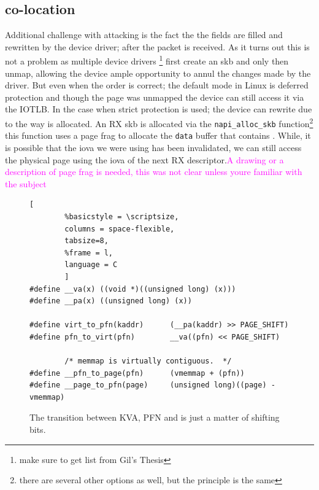 \subsection{\shinfo co-location}
Additional challenge with attacking \shinfo is the fact the the fields are filled and rewritten by the device driver; after the packet is received. As it turns out this is not a problem as multiple device drivers \footnote{make sure to get list from Gil's Thesis} first create an skb and only then unmap, allowing the device ample opportunity to annul the changes made by the driver. But even when the order is correct; the default mode in Linux is deferred protection and though the page was unmapped the device can still access it via the IOTLB. In the case when strict protection is used; the device can rewrite \shinfo due to the way \shinfo is allocated. An RX skb is allocated via the \texttt{napi\_alloc\_skb} function\footnote{there are several other options as well, but the principle is the same} this function uses a page frag to allocate the \texttt{data} buffer that contains \shinfo. While, it is possible that the iova we were using has been invalidated, we can still access the physical page using the iova of the next RX descriptor.\textcolor{magenta}{A drawing or a description of page frag is needed, this was not clear unless youre familiar with the subject}
\begin{figure}[t]
                \begin{lstlisting}[
        %basicstyle = \scriptsize,
        columns = space-flexible,
        tabsize=8,
        %frame = l,
        language = C
        ]
#define __va(x) ((void *)((unsigned long) (x)))
#define __pa(x) ((unsigned long) (x))

#define virt_to_pfn(kaddr)      (__pa(kaddr) >> PAGE_SHIFT)
#define pfn_to_virt(pfn)        __va((pfn) << PAGE_SHIFT)

        /* memmap is virtually contiguous.  */
#define __pfn_to_page(pfn)      (vmemmap + (pfn))  
#define __page_to_pfn(page)     (unsigned long)((page) - vmemmap)
                \end{lstlisting}
        \caption{ The transition between KVA, PFN and \page is just a matter of shifting bits.
                }
        \label{fig:mem_model}
\end{figure}
